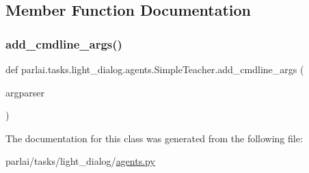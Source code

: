 \subsection{Member Function Documentation}
\mbox{\label{classparlai_1_1tasks_1_1light__dialog_1_1agents_1_1SimpleTeacher_aeb34b661b221d35efef6f24ba5c27e48}} 
\subsubsection{\texorpdfstring{add\+\_\+cmdline\+\_\+args()}{add\_cmdline\_args()}}
{\footnotesize\ttfamily def parlai.\+tasks.\+light\+\_\+dialog.\+agents.\+Simple\+Teacher.\+add\+\_\+cmdline\+\_\+args (\begin{DoxyParamCaption}\item[{}]{argparser }\end{DoxyParamCaption})}



The documentation for this class was generated from the following file\+:\begin{DoxyCompactItemize}
\item 
parlai/tasks/light\+\_\+dialog/\hyperlink{parlai_2tasks_2light__dialog_2agents_8py}{agents.\+py}\end{DoxyCompactItemize}
